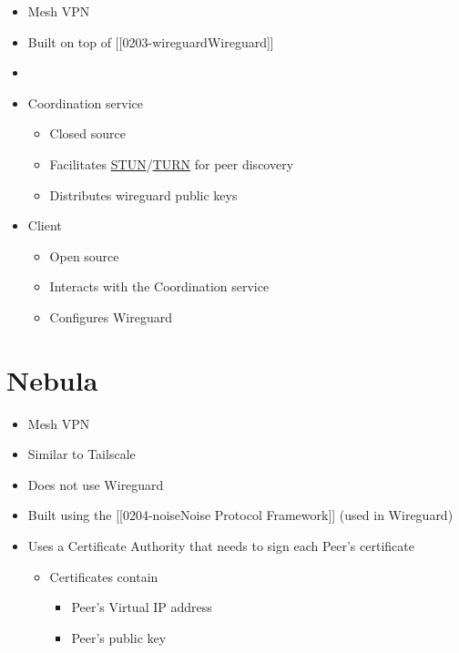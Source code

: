 \begin{itemize}
\tightlist
\item
  Mesh VPN
\item
  Built on top of {[}{[}0203-wireguard\textbar Wireguard{]}{]}
\item
\item
  Coordination service

  \begin{itemize}
  \tightlist
  \item
    Closed source
  \item
    Facilitates
    \href{notes/0202-nat\#Session\%20Traversal\%20Utilities\%20for\%20NAT\%20(STUN)}{STUN}/\href{notes/0202-nat\#test}{TURN}
    for peer discovery
  \item
    Distributes wireguard public keys
  \end{itemize}
\item
  Client

  \begin{itemize}
  \tightlist
  \item
    Open source
  \item
    Interacts with the Coordination service
  \item
    Configures Wireguard
  \end{itemize}
\end{itemize}

\hypertarget{nebula}{%
\section{Nebula}\label{nebula}}

\begin{itemize}
\tightlist
\item
  Mesh VPN
\item
  Similar to Tailscale
\item
  Does not use Wireguard
\item
  Built using the {[}{[}0204-noise\textbar Noise Protocol
  Framework{]}{]} (used in Wireguard)
\item
  Uses a Certificate Authority that needs to sign each Peer's
  certificate

  \begin{itemize}
  \tightlist
  \item
    Certificates contain

    \begin{itemize}
    \tightlist
    \item
      Peer's Virtual IP address
    \item
      Peer's public key
    \end{itemize}
  \end{itemize}
\end{itemize}

